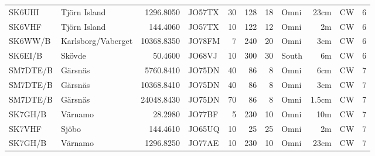 \begin{longtable}{llrlrrrlrll}
	SK6UHI   & Tjörn Island        &  1296.8050 & JO57TX &   30 &  128 &   18 & Omni    &  23cm & CW     & 6    \\
	SK6VHF   & Tjörn Island        &   144.4060 & JO57TX &   10 &  122 &   12 & Omni    &    2m & CW     & 6    \\
	SK6WW/B  & Karlsborg/Vaberget  & 10368.8350 & JO78FM &    7 &  240 &   20 & Omni    &   3cm & CW     & 6    \\
	SK6EI/B  & Skövde              &    50.4600 & JO68VJ &   10 &  300 &   30 & South   &    6m & CW     & 6    \\
	SM7DTE/B & Gärsnäs             &  5760.8410 & JO75DN &   40 &   86 &    8 & Omni    &   6cm & CW     & 7    \\
	SM7DTE/B & Gärsnäs             & 10368.8410 & JO75DN &   40 &   86 &    8 & Omni    &   3cm & CW     & 7    \\
	SM7DTE/B & Gärsnäs             & 24048.8430 & JO75DN &   70 &   86 &    8 & Omni    & 1.5cm & CW     & 7    \\
	SK7GH/B  & Värnamo             &    28.2980 & JO77BF &    5 &  230 &   10 & Omni    &   10m & CW     & 7    \\
	SK7VHF   & Sjöbo               &   144.4610 & JO65UQ &   10 &   25 &   25 & Omni    &    2m & CW     & 7    \\
	SK7GH/B  & Värnamo             &  1296.8250 & JO77AE &   10 &  230 &   10 & Omni    &  23cm & CW     & 7
\end{longtable}

\normalsize

\clearpage

